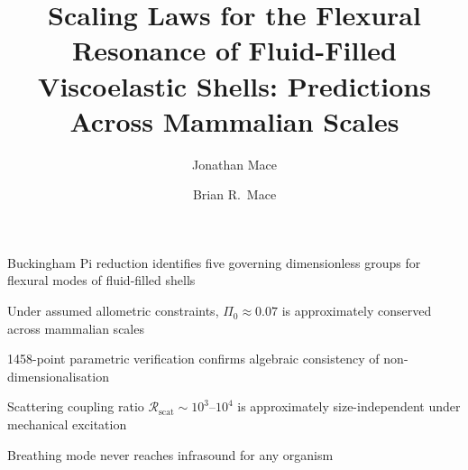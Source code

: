 \documentclass[review]{elsarticle}
\begin{document}
\begin{frontmatter}

\title{Scaling Laws for the Flexural Resonance of Fluid-Filled
Viscoelastic Shells: Predictions Across Mammalian Scales}

\author[msr]{Jonathan Mace}

\author[auckland]{Brian R.\ Mace}



\begin{highlights}
\item Buckingham Pi reduction identifies five governing dimensionless groups for flexural modes of fluid-filled shells
\item Under assumed allometric constraints, $\Pi_0 \approx 0.07$ is approximately conserved across mammalian scales
\item 1458-point parametric verification confirms algebraic consistency of non-dimensionalisation
\item Scattering coupling ratio $\mathcal{R}_\mathrm{scat} \sim 10^3$--$10^4$ is approximately size-independent under mechanical excitation
\item Breathing mode never reaches infrasound for any organism
\end{highlights}


\end{frontmatter}
\end{document}
